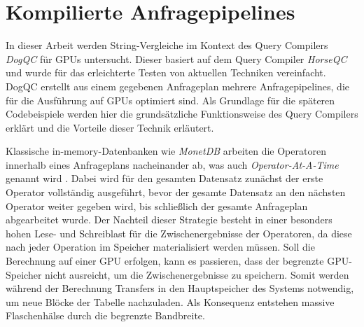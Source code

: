 \chapter{Kompilierte Anfragepipelines}
\label{sec:pipelining}

In dieser Arbeit werden String-Vergleiche im Kontext des Query Compilers \emph{DogQC} für GPUs untersucht.
Dieser basiert auf dem Query Compiler \emph{HorseQC} \cite{Funke2018} und wurde für das erleichterte Testen von aktuellen Techniken vereinfacht.
DogQC erstellt aus einem gegebenen Anfrageplan mehrere Anfragepipelines, die für die Ausführung auf GPUs optimiert sind.
Als Grundlage für die späteren Codebeispiele werden hier die grundsätzliche Funktionsweise des Query Compilers erklärt und die Vorteile dieser Technik erläutert.

Klassische in-memory-Datenbanken wie \emph{MonetDB} arbeiten die Operatoren innerhalb eines Anfrageplans nacheinander ab, was auch \emph{Operator-At-A-Time} genannt wird \cite{Varga2018}.
Dabei wird für den gesamten Datensatz zunächst der erste Operator vollständig ausgeführt, bevor der gesamte Datensatz an den nächsten Operator weiter gegeben wird, bis schließlich der gesamte Anfrageplan abgearbeitet wurde.
Der Nachteil dieser Strategie besteht in einer besonders hohen Lese- und Schreiblast für die Zwischenergebnisse der Operatoren, da diese nach jeder Operation im Speicher materialisiert werden müssen.
Soll die Berechnung auf einer GPU erfolgen, kann es passieren, dass der begrenzte GPU-Speicher nicht ausreicht, um die Zwischenergebnisse zu speichern.
Somit werden während der Berechnung Transfers in den Hauptspeicher des Systems notwendig, um neue Blöcke der Tabelle nachzuladen.
Als Konsequenz entstehen massive Flaschenhälse durch die begrenzte Bandbreite.


